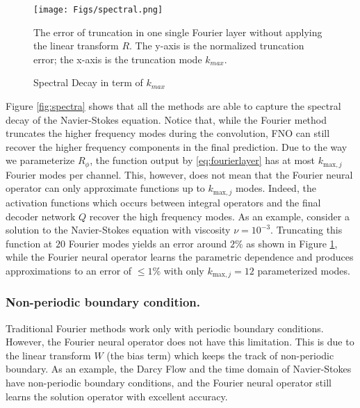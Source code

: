\begin{figure}[t]
    \centering
    \texttt{[image: Figs/spectral.png]}
        \caption{Spectral Decay in term of $k_{max}$ }
    \label{fig:spectral2}
    \small{ The error of truncation in one single Fourier layer without applying the linear transform $R$. The y-axis is the normalized truncation error; the x-axis is the truncation mode $k_{max}$.  }
\end{figure}

Figure \ref{fig:spectra} shows that all the methods are able to capture the spectral decay of the Navier-Stokes equation.
Notice that, while the Fourier method truncates the higher frequency modes during the convolution, FNO can still recover the higher frequency components in the final prediction. 
Due to the way we parameterize $R_\phi$, the function output by \eqref{eq:fourierlayer} has at most $k_{\text{max},j}$ Fourier modes per channel. This, however, does not mean that the Fourier neural operator can only approximate functions up to $k_{\text{max},j}$ modes. Indeed, the activation functions which occurs between integral operators and the final decoder network $Q$ recover the high frequency modes.
As an example, consider a solution to the Navier-Stokes equation with viscosity $\nu=10^{-3}$. Truncating this function at $20$ Fourier modes yields an error around $2\%$ as shown in Figure \ref{fig:spectral2}, while the Fourier neural operator learns the parametric dependence and produces approximations to an error of $\leq 1\%$ with only $k_{\text{max},j}=12$ parameterized modes.


\subsubsection{Non-periodic boundary condition.} Traditional Fourier methods work only with periodic boundary conditions. However, the Fourier neural operator does not have this limitation. This is due to the linear transform $W$ (the bias term) which keeps the track of non-periodic boundary. As an example, the Darcy Flow and the time domain of Navier-Stokes have non-periodic boundary conditions, and the Fourier neural operator still learns the solution operator with excellent accuracy.

